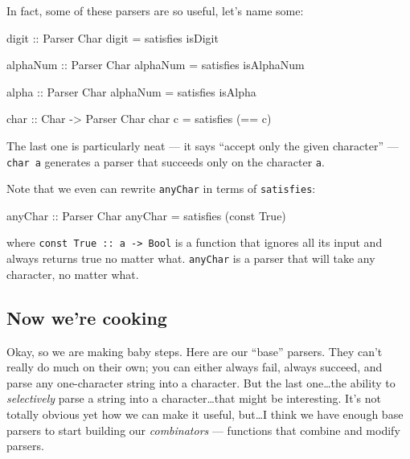 \documentclass[]{article}
\newenvironment{Shaded}{}{}
\newcommand{\DataTypeTok}[1]{\textcolor[rgb]{0.56,0.13,0.00}{{#1}}}
\newcommand{\OtherTok}[1]{\textcolor[rgb]{0.00,0.44,0.13}{{#1}}}
\newcommand{\FunctionTok}[1]{\textcolor[rgb]{0.02,0.16,0.49}{{#1}}}
\newcommand{\NormalTok}[1]{{#1}}
\begin{document}
In fact, some of these parsers are so useful, let's name some:

\begin{Shaded}
\begin{Highlighting}[]
\OtherTok{digit ::} \DataTypeTok{Parser} \DataTypeTok{Char}
\NormalTok{digit }\FunctionTok{=} \NormalTok{satisfies isDigit}

\OtherTok{alphaNum ::} \DataTypeTok{Parser} \DataTypeTok{Char}
\NormalTok{alphaNum }\FunctionTok{=} \NormalTok{satisfies isAlphaNum}

\OtherTok{alpha ::} \DataTypeTok{Parser} \DataTypeTok{Char}
\NormalTok{alphaNum }\FunctionTok{=} \NormalTok{satisfies isAlpha}

\OtherTok{char ::} \DataTypeTok{Char} \OtherTok{->} \DataTypeTok{Parser} \DataTypeTok{Char}
\NormalTok{char c }\FunctionTok{=} \NormalTok{satisfies (}\FunctionTok{==} \NormalTok{c)}
\end{Highlighting}
\end{Shaded}

The last one is particularly neat --- it says ``accept only the given character'' ---
\texttt{char\ \textquotesingle{}a\textquotesingle{}} generates a parser that succeeds only on the
character \texttt{a}.

Note that we even can rewrite \texttt{anyChar} in terms of \texttt{satisfies}:

\begin{Shaded}
\begin{Highlighting}[]
\OtherTok{anyChar ::} \DataTypeTok{Parser} \DataTypeTok{Char}
\NormalTok{anyChar }\FunctionTok{=} \NormalTok{satisfies (const }\DataTypeTok{True}\NormalTok{)}
\end{Highlighting}
\end{Shaded}

where \texttt{const\ True\ ::\ a\ -\textgreater{}\ Bool} is a function that ignores all its input
and always returns true no matter what. \texttt{anyChar} is a parser that will take any character,
no matter what.

\subsection{Now we're cooking}\label{now-were-cooking}

Okay, so we are making baby steps. Here are our ``base'' parsers. They can't really do much on their
own; you can either always fail, always succeed, and parse any one-character string into a
character. But the last one\ldots{}the ability to \emph{selectively} parse a string into a
character\ldots{}that might be interesting. It's not totally obvious yet how we can make it useful,
but\ldots{}I think we have enough base parsers to start building our \emph{combinators} ---
functions that combine and modify parsers.
\end{document}
